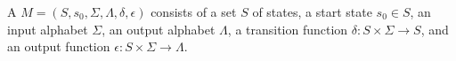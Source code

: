 A  $M = (S, s_0, \Sigma, \Lambda, \delta, \epsilon)$
consists of
  a set $S$ of states,
  a start state $s_0 \in S$,
  an input alphabet $\Sigma$,
  an output alphabet $\Lambda$,
  a transition function $\delta: S \times \Sigma \to S$, and
  an output function $\epsilon: S \times \Sigma \to \Lambda$.


